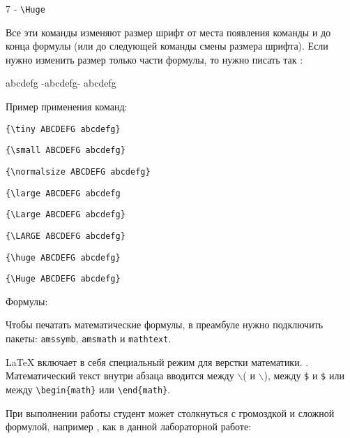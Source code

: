 \documentclass[a4paper,12pt]{article}
\begin{document}
7 - \verb|\Huge| 

Все эти команды изменяют размер шрифт от места появления команды и до конца формулы (или до следующей команды смены размера шрифта). Если нужно изменить размер только части формулы, то нужно писать так \cite{1}\cite{2} :

abcdefg -{\huge abcdefg}- abcdefg

Пример применения команд:

\verb|{\tiny ABCDEFG abcdefg}| \hspace{1cm}{\tiny ABCDEFG abcdefg}   

\verb|{\small ABCDEFG abcdefg}| \hspace{1cm}{\small ABCDEFG abcdefg}  

\verb|{\normalsize ABCDEFG abcdefg}| \hspace{1cm}{\normalsize ABCDEFG abcdefg}  

\verb|{\large ABCDEFG abcdefg| \hspace{1cm}{\large ABCDEFG abcdefg}  

\verb|{\Large ABCDEFG abcdefg}| \hspace{1cm}{\Large ABCDEFG abcdefg}  

\verb|{\LARGE ABCDEFG abcdefg}| \hspace{1cm}{\LARGE ABCDEFG abcdefg}  

\verb|{\huge ABCDEFG abcdefg}| \hspace{1cm}{\huge ABCDEFG abcdefg}  

\verb|{\Huge ABCDEFG abcdefg}| \hspace{1cm}{\Huge ABCDEFG abcdefg}  

\newpage
\begin{flushleft}
{\Large Формулы:}
\end{flushleft}

Чтобы печатать математические формулы, в преамбуле нужно подключить пакеты:  \verb|amssymb|, \verb|amsmath| и \verb|mathtext|.

LaTeX включает в себя специальный режим для верстки математики.  . Математический текст внутри абзаца вводится между  $\backslash$( и  $\backslash$), между \texttt{\$} и \texttt{\$} или между  \verb|\begin{math}| или \verb|\end{math}|. \cite[3.1 Общие сведения, стр.49]{3} 

При выполнении работы студент может столкнуться с громоздкой и сложной формулой, например , как в данной лабораторной работе:
\end{document}
